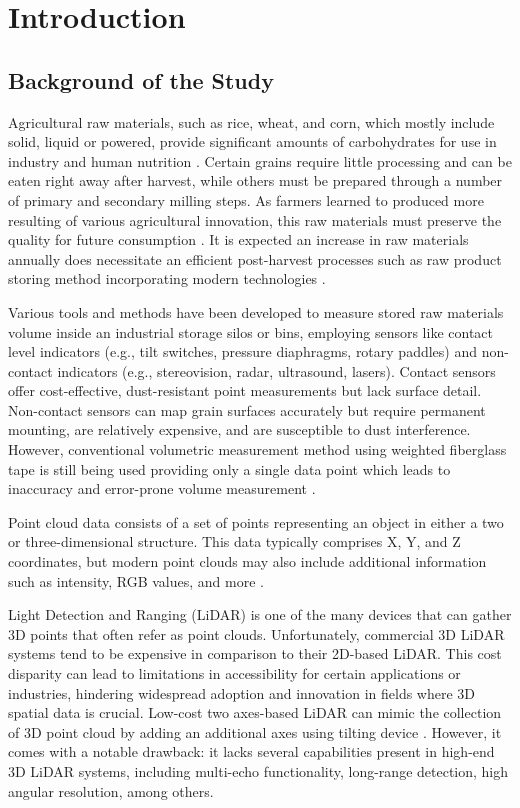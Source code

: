 \renewcommand{\thechapter}{\Roman{chapter}}
\chapter{Introduction}
\renewcommand{\thechapter}{\arabic{chapter}}
\label{ch:Introduction}
\thispagestyle{empty}

\section{Background of the Study}
\label{intro:sec:Background of the Study}

Agricultural raw materials, such as rice, wheat, and corn, which mostly include solid, liquid or powered, provide significant amounts of carbohydrates for use in industry and human nutrition . Certain grains require little processing and can be eaten right away after harvest, while others must be prepared through a number of primary and secondary milling steps. As farmers learned to produced more resulting of various agricultural innovation, this raw materials must preserve the quality for future consumption \citep{Bucklin2019175}.
It is expected an increase in raw materials annually does necessitate an efficient post-harvest processes such as raw product storing method incorporating modern technologies \citep{yegorova_2021}.

Various tools and methods have been developed to measure stored raw materials volume inside an industrial storage silos or bins, employing sensors like contact level indicators (e.g., tilt switches, pressure diaphragms, rotary paddles) and non-contact indicators (e.g., stereovision, radar, ultrasound, lasers). Contact sensors offer cost-effective, dust-resistant point measurements but lack surface detail. Non-contact sensors can map grain surfaces accurately but require permanent mounting, are relatively expensive, and are susceptible to dust interference. However, conventional volumetric measurement method using weighted fiberglass tape is still being used providing only a single data point which leads to inaccuracy and error-prone volume measurement \citep{turner2017}.

Point cloud data consists of a set of points representing an object in either a two or three-dimensional structure. This data typically comprises X, Y, and Z coordinates, but modern point clouds may also include additional information such as intensity, RGB values, and more \citep{wang2019306, stojanovic2023point}.

Light Detection and Ranging (LiDAR) is one of the many devices that can gather 3D points that often refer as point clouds. Unfortunately, commercial 3D LiDAR systems tend to be expensive in comparison to their 2D-based LiDAR. This cost disparity can lead to limitations in accessibility for certain applications or industries, hindering widespread adoption and innovation in fields where 3D spatial data is crucial. Low-cost two axes-based LiDAR can mimic the collection of 3D point cloud by adding an additional axes using tilting device \citep{clar2022}. However, it comes with a notable drawback: it lacks several capabilities present in high-end 3D LiDAR systems, including multi-echo functionality, long-range detection, high angular resolution, among others.

